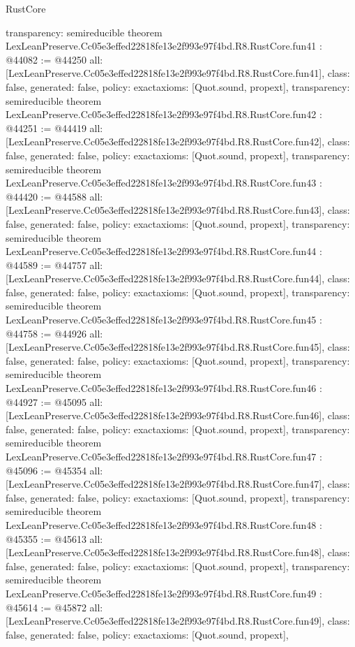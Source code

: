 \begin{lexlean}{RustCore}
\begin{coremodule}
{  transparency: semireducible
}
theorem LexLeanPreserve.Cc05e3effed22818fe13e2f993e97f4bd.R8.RustCore.fun41 : @44082 := @44250 {
  all: [LexLeanPreserve.Cc05e3effed22818fe13e2f993e97f4bd.R8.RustCore.fun41],
  class: false,
  generated: false,
  policy: exact{axioms: [Quot.sound, propext]},
  transparency: semireducible
}
theorem LexLeanPreserve.Cc05e3effed22818fe13e2f993e97f4bd.R8.RustCore.fun42 : @44251 := @44419 {
  all: [LexLeanPreserve.Cc05e3effed22818fe13e2f993e97f4bd.R8.RustCore.fun42],
  class: false,
  generated: false,
  policy: exact{axioms: [Quot.sound, propext]},
  transparency: semireducible
}
theorem LexLeanPreserve.Cc05e3effed22818fe13e2f993e97f4bd.R8.RustCore.fun43 : @44420 := @44588 {
  all: [LexLeanPreserve.Cc05e3effed22818fe13e2f993e97f4bd.R8.RustCore.fun43],
  class: false,
  generated: false,
  policy: exact{axioms: [Quot.sound, propext]},
  transparency: semireducible
}
theorem LexLeanPreserve.Cc05e3effed22818fe13e2f993e97f4bd.R8.RustCore.fun44 : @44589 := @44757 {
  all: [LexLeanPreserve.Cc05e3effed22818fe13e2f993e97f4bd.R8.RustCore.fun44],
  class: false,
  generated: false,
  policy: exact{axioms: [Quot.sound, propext]},
  transparency: semireducible
}
theorem LexLeanPreserve.Cc05e3effed22818fe13e2f993e97f4bd.R8.RustCore.fun45 : @44758 := @44926 {
  all: [LexLeanPreserve.Cc05e3effed22818fe13e2f993e97f4bd.R8.RustCore.fun45],
  class: false,
  generated: false,
  policy: exact{axioms: [Quot.sound, propext]},
  transparency: semireducible
}
theorem LexLeanPreserve.Cc05e3effed22818fe13e2f993e97f4bd.R8.RustCore.fun46 : @44927 := @45095 {
  all: [LexLeanPreserve.Cc05e3effed22818fe13e2f993e97f4bd.R8.RustCore.fun46],
  class: false,
  generated: false,
  policy: exact{axioms: [Quot.sound, propext]},
  transparency: semireducible
}
theorem LexLeanPreserve.Cc05e3effed22818fe13e2f993e97f4bd.R8.RustCore.fun47 : @45096 := @45354 {
  all: [LexLeanPreserve.Cc05e3effed22818fe13e2f993e97f4bd.R8.RustCore.fun47],
  class: false,
  generated: false,
  policy: exact{axioms: [Quot.sound, propext]},
  transparency: semireducible
}
theorem LexLeanPreserve.Cc05e3effed22818fe13e2f993e97f4bd.R8.RustCore.fun48 : @45355 := @45613 {
  all: [LexLeanPreserve.Cc05e3effed22818fe13e2f993e97f4bd.R8.RustCore.fun48],
  class: false,
  generated: false,
  policy: exact{axioms: [Quot.sound, propext]},
  transparency: semireducible
}
theorem LexLeanPreserve.Cc05e3effed22818fe13e2f993e97f4bd.R8.RustCore.fun49 : @45614 := @45872 {
  all: [LexLeanPreserve.Cc05e3effed22818fe13e2f993e97f4bd.R8.RustCore.fun49],
  class: false,
  generated: false,
  policy: exact{axioms: [Quot.sound, propext]},
}
\end{coremodule}
\end{lexlean}
